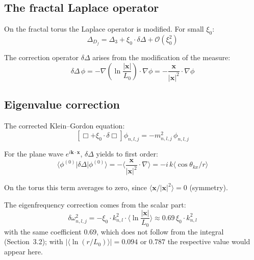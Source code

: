 \subsection{The fractal Laplace operator}

On the fractal torus the Laplace operator is modified.
For small $\xi_0$:
\begin{equation}
  \Delta_{D_f} = \Delta_3 + \xi_0 \cdot \delta\Delta + \mathcal{O}(\xi_0^2)
  \label{eq:frak-laplace}
\end{equation}

The correction operator $\delta\Delta$ arises from the
modification of the measure:
\begin{equation}
  \delta\Delta\,\phi
  = -\nabla\!\left(\ln\frac{|\mathbf{x}|}{L_0}\right)\cdot\nabla\phi
  = -\frac{\mathbf{x}}{|\mathbf{x}|^2}\cdot\nabla\phi
  \label{eq:delta-Delta}
\end{equation}

\subsection{Eigenvalue correction}

The corrected Klein--Gordon equation:
\begin{equation}
  \left[\Box + \xi_0\cdot\delta\Box\right]\phi_{n,l,j}
  = -m_{n,l,j}^2\,\phi_{n,l,j}
\end{equation}

For the plane wave $e^{i\mathbf{k}\cdot\mathbf{x}}$,
$\delta\Delta$ yields to first order:
\begin{equation}
  \langle\phi^{(0)}|\delta\Delta|\phi^{(0)}\rangle
  = -\langle\frac{\mathbf{x}}{|\mathbf{x}|^2}\cdot\nabla\rangle
  = -i\,k\langle\cos\theta_{kx}/r\rangle
\end{equation}

On the torus this term averages to zero, since
$\langle \mathbf{x}/|\mathbf{x}|^2 \rangle = 0$ (symmetry).

The eigenfrequency correction comes from the scalar part:
\begin{equation}
  \delta\omega_{n,l,j}^2
  = -\xi_0 \cdot k_{n,l}^2 \cdot \langle\ln\frac{|\mathbf{x}|}{L_0}\rangle
  \approx 0.69\,\xi_0 \cdot k_{n,l}^2
  \label{eq:omega-korrektur}
\end{equation}
with the same coefficient $0.69$, which does not follow from the
integral (Section~3.2); with $|\langle\ln(r/L_0)\rangle| = 0.094$ or
$0.787$ the respective value would appear here.

